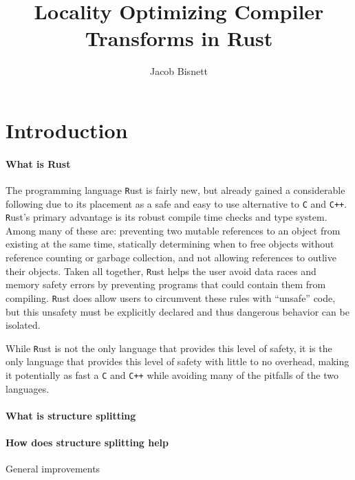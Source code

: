 \documentclass[12pt,final]{article}
\newcommand{\rust}[1]{\texttt{#1}}
\newcommand{\rustname}{{\texttt Rust}}
\def \rust {\rustname{}\xspace}
\newcommand{\cname}{{\texttt{C}}}
\def \c {\cname{}\xspace}
\newcommand{\cppname}{{\texttt{C++}}}
\def \cpp {\cppname{}\xspace}
\begin{document}
\title{Locality Optimizing Compiler Transforms in Rust}
\author{Jacob Bisnett}
\maketitle

\section{Introduction}
\label{sec:intro}

\paragraph{What is Rust}
The programming language \rust is fairly new, but already gained a considerable
following due to its placement as a safe and easy to use alternative to \c and
\cpp. \rust's primary advantage is its robust compile time checks and type
system. Among many of these are:
preventing two mutable references to an object from existing at the same time, 
statically determining when to free objects without reference counting or
garbage collection,
and not allowing references to outlive their objects.
Taken all together, \rust helps the user avoid data races and memory safety
errors by preventing programs that could contain them from compiling.
\rust does allow users to circumvent these rules with ``unsafe'' code,
but this unsafety must be explicitly declared and thus dangerous behavior can be
isolated.

While \rust is not the only language that provides this level of safety, it is
the only language that provides this level of safety with little to no overhead,
making it potentially as fast a \c and \cpp while avoiding many of the
pitfalls of the two languages. 



\paragraph{What is structure splitting}

\paragraph{How does structure splitting help}
General improvements
\end{document}

